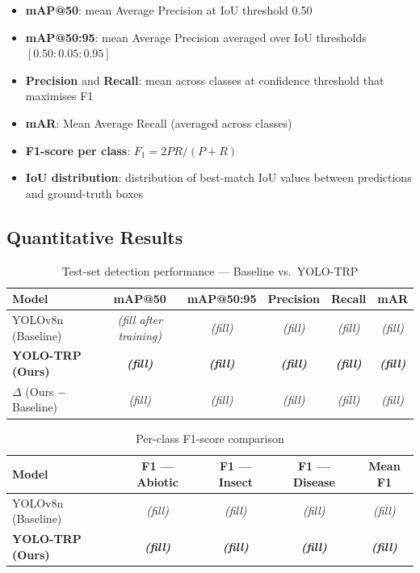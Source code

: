 \documentclass[12pt, a4paper]{article}
\begin{document}
\begin{itemize}
    \item \textbf{mAP@50}: mean Average Precision at IoU threshold 0.50
    \item \textbf{mAP@50:95}: mean Average Precision averaged over IoU thresholds $[0.50:0.05:0.95]$
    \item \textbf{Precision} and \textbf{Recall}: mean across classes at confidence threshold that maximises F1
    \item \textbf{mAR}: Mean Average Recall (averaged across classes)
    \item \textbf{F1-score per class}: $F_1 = 2PR/(P+R)$
    \item \textbf{IoU distribution}: distribution of best-match IoU values between predictions and ground-truth boxes
\end{itemize}

\subsection{Quantitative Results}

\begin{table}[H]
\centering
\caption{Test-set detection performance — Baseline vs.\ YOLO-TRP}
\label{tab:results}
\renewcommand{\arraystretch}{1.35}
\begin{tabular}{lccccc}
\toprule
\textbf{Model} & \textbf{mAP@50} & \textbf{mAP@50:95} & \textbf{Precision} & \textbf{Recall} & \textbf{mAR} \\
\midrule
YOLOv8n (Baseline)  & \textit{(fill after training)} & \textit{(fill)} & \textit{(fill)} & \textit{(fill)} & \textit{(fill)} \\
\textbf{YOLO-TRP (Ours)} & \textbf{\textit{(fill)}} & \textbf{\textit{(fill)}} & \textbf{\textit{(fill)}} & \textbf{\textit{(fill)}} & \textbf{\textit{(fill)}} \\
$\Delta$ (Ours $-$ Baseline) & \textit{(fill)} & \textit{(fill)} & \textit{(fill)} & \textit{(fill)} & \textit{(fill)} \\
\bottomrule
\end{tabular}
\end{table}

\begin{table}[H]
\centering
\caption{Per-class F1-score comparison}
\label{tab:f1}
\renewcommand{\arraystretch}{1.35}
\begin{tabular}{lcccc}
\toprule
\textbf{Model} & \textbf{F1 — Abiotic} & \textbf{F1 — Insect} & \textbf{F1 — Disease} & \textbf{Mean F1} \\
\midrule
YOLOv8n (Baseline)          & \textit{(fill)} & \textit{(fill)} & \textit{(fill)} & \textit{(fill)} \\
\textbf{YOLO-TRP (Ours)}    & \textbf{\textit{(fill)}} & \textbf{\textit{(fill)}} & \textbf{\textit{(fill)}} & \textbf{\textit{(fill)}} \\
\bottomrule
\end{tabular}
\end{table}
\end{document}
